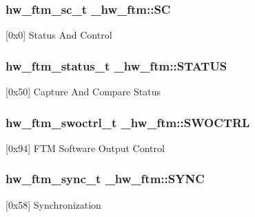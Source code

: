 \subsubsection[{\texorpdfstring{SC}{SC}}]{ {\bf hw\+\_\+ftm\+\_\+sc\+\_\+t} \+\_\+hw\+\_\+ftm\+::\+SC}\hypertarget{struct__hw__ftm_a7c673792073e9fee52359933a9a89143}{}\label{struct__hw__ftm_a7c673792073e9fee52359933a9a89143}
\mbox{[}0x0\mbox{]} Status And Control 
\subsubsection[{\texorpdfstring{S\+T\+A\+T\+US}{STATUS}}]{ {\bf hw\+\_\+ftm\+\_\+status\+\_\+t} \+\_\+hw\+\_\+ftm\+::\+S\+T\+A\+T\+US}\hypertarget{struct__hw__ftm_a8a67b6a216bc68fe57c90b1351d371ef}{}\label{struct__hw__ftm_a8a67b6a216bc68fe57c90b1351d371ef}
\mbox{[}0x50\mbox{]} Capture And Compare Status 
\subsubsection[{\texorpdfstring{S\+W\+O\+C\+T\+RL}{SWOCTRL}}]{ {\bf hw\+\_\+ftm\+\_\+swoctrl\+\_\+t} \+\_\+hw\+\_\+ftm\+::\+S\+W\+O\+C\+T\+RL}\hypertarget{struct__hw__ftm_a74d982606c8122096d44a4f40a6272ca}{}\label{struct__hw__ftm_a74d982606c8122096d44a4f40a6272ca}
\mbox{[}0x94\mbox{]} F\+TM Software Output Control 
\subsubsection[{\texorpdfstring{S\+Y\+NC}{SYNC}}]{ {\bf hw\+\_\+ftm\+\_\+sync\+\_\+t} \+\_\+hw\+\_\+ftm\+::\+S\+Y\+NC}\hypertarget{struct__hw__ftm_a6d9ecec26e858b141963e41fe0e75e45}{}\label{struct__hw__ftm_a6d9ecec26e858b141963e41fe0e75e45}
\mbox{[}0x58\mbox{]} Synchronization 
